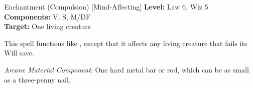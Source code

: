 {Enchantment (Compulsion) [Mind-Affecting]}
{
	\textbf{Level:}
	Law 6, Wiz 5\\
	\textbf{Components:}
	V, S, M/DF\\
	\textbf{Target:}
	One living creature\\
}
{
	This spell functions like , except that it affects any living creature that fails its Will save.

	\textit{Arcane Material Component}:
	One hard metal bar or rod, which can be as small as a three-penny nail.

}
